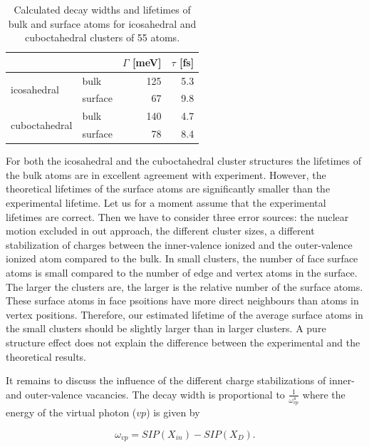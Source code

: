 \begin{table}[h]
 \centering
 \caption{Calculated decay widths and lifetimes of bulk and surface atoms
          for icosahedral and cuboctahedral clusters of 55 atoms.}
 \begin{tabular}{llrr}
  \toprule
               &                            & $\Gamma$ [meV] & $\tau$ [fs]\\
  \midrule
   \multirow{2}{*}{icosahedral}   & bulk    & 125            & 5.3 \\
                                  & surface &  67            & 9.8 \\
  \midrule
   \multirow{2}{*}{cuboctahedral} & bulk    & 140            & 4.7 \\
                                  & surface &  78            & 8.4 \\
  \bottomrule
 \end{tabular}
 \label{table:lifetimes}
\end{table}

For both the icosahedral and the cuboctahedral cluster structures the lifetimes
of the bulk atoms are in excellent agreement with experiment.
However, the theoretical lifetimes of the surface atoms are significantly
smaller than the experimental lifetime. Let us for a moment assume that the
experimental lifetimes are correct. Then we have to consider three error sources:
the nuclear motion excluded in out approach, the different cluster sizes,
a different stabilization of charges between the
inner-valence ionized and the outer-valence ionized atom compared to the bulk.
In small clusters, the number of face surface atoms is small compared to the
number of edge and vertex atoms in the surface. The larger the clusters are,
the larger is the relative number of the surface atoms. These surface atoms
in face psoitions have more direct neighbours than atoms in vertex positions.
Therefore, our estimated lifetime of the average surface atoms in the small
clusters should be slightly larger than in larger clusters. A pure structure
effect does not explain the difference between the experimental and the
theoretical results.

It remains to discuss the influence of the different charge stabilizations of
inner- and outer-valence vacancies. The decay width is proportional to
$\frac{1}{\omega_{vp}^4}$ where the energy of the virtual photon ($vp$) is given
by

\begin{equation}
 \omega_{vp} = SIP(X_{in}) - SIP(X_D)   .
\end{equation}

